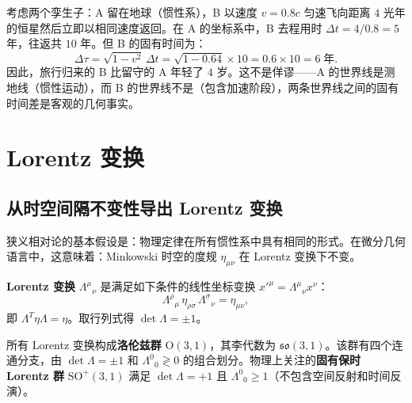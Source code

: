 \begin{example}
考虑两个孪生子：A 留在地球（惯性系），B 以速度 $v = 0.8c$ 匀速飞向距离 $4$ 光年的恒星然后立即以相同速度返回。在 A 的坐标系中，B 去程用时 $\Delta t = 4/0.8 = 5$ 年，往返共 $10$ 年。但 B 的固有时间为：
\begin{equation}
    \Delta\tau = \sqrt{1 - v^2} \, \Delta t = \sqrt{1 - 0.64} \times 10 = 0.6 \times 10 = 6 \; \text{年}.
\end{equation}
因此，旅行归来的 B 比留守的 A 年轻了 $4$ 岁。这不是佯谬——A 的世界线是测地线（惯性运动），而 B 的世界线不是（包含加速阶段），两条世界线之间的固有时间差是客观的几何事实。
\end{example}

\section{Lorentz 变换}

\subsection{从时空间隔不变性导出 Lorentz 变换}

狭义相对论的基本假设是：物理定律在所有惯性系中具有相同的形式。在微分几何语言中，这意味着：Minkowski 时空的度规 $\eta_{\mu\nu}$ 在 Lorentz 变换下不变。

\begin{definition}[Lorentz 变换]
\textbf{Lorentz 变换} $\Lambda^\mu{}_\nu$ 是满足如下条件的线性坐标变换 $x'^\mu = \Lambda^\mu{}_\nu x^\nu$：
\begin{equation}\label{eq:lorentz_condition}
    \Lambda^\rho{}_\mu \,\eta_{\rho\sigma} \,\Lambda^\sigma{}_\nu = \eta_{\mu\nu},
\end{equation}
即 $\Lambda^T \eta \Lambda = \eta$。取行列式得 $\det\Lambda = \pm 1$。
\end{definition}

\begin{property}[Lorentz 群]
所有 Lorentz 变换构成\textbf{洛伦兹群} $\mathrm{O}(3,1)$，其李代数为 $\mathfrak{so}(3,1)$。该群有四个连通分支，由 $\det\Lambda = \pm 1$ 和 $\Lambda^0{}_0 \gtrless 0$ 的组合划分。物理上关注的\textbf{固有保时 Lorentz 群} $\mathrm{SO}^+(3,1)$ 满足 $\det\Lambda = +1$ 且 $\Lambda^0{}_0 \ge 1$（不包含空间反射和时间反演）。
\end{property}

